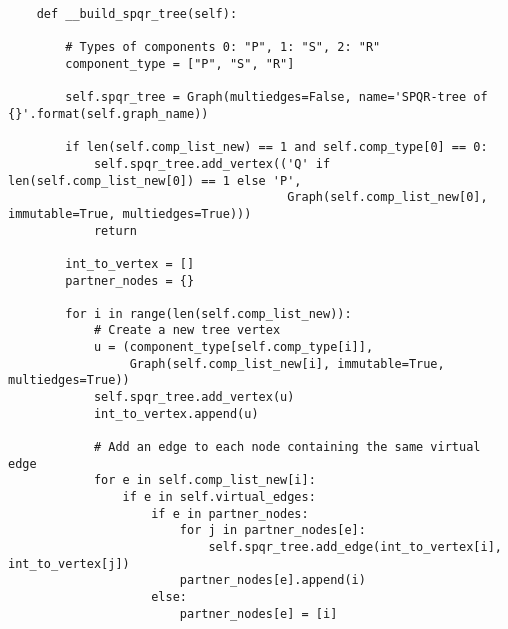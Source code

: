 \begin{center}
\begin{verbatim}
	def __build_spqr_tree(self):

		# Types of components 0: "P", 1: "S", 2: "R"
		component_type = ["P", "S", "R"]

		self.spqr_tree = Graph(multiedges=False, name='SPQR-tree of {}'.format(self.graph_name))

		if len(self.comp_list_new) == 1 and self.comp_type[0] == 0:
			self.spqr_tree.add_vertex(('Q' if len(self.comp_list_new[0]) == 1 else 'P',
									   Graph(self.comp_list_new[0], immutable=True, multiedges=True)))
			return

		int_to_vertex = []
		partner_nodes = {}

		for i in range(len(self.comp_list_new)):
			# Create a new tree vertex
			u = (component_type[self.comp_type[i]],
				 Graph(self.comp_list_new[i], immutable=True, multiedges=True))
			self.spqr_tree.add_vertex(u)
			int_to_vertex.append(u)

			# Add an edge to each node containing the same virtual edge
			for e in self.comp_list_new[i]:
				if e in self.virtual_edges:
					if e in partner_nodes:
						for j in partner_nodes[e]:
							self.spqr_tree.add_edge(int_to_vertex[i], int_to_vertex[j])
						partner_nodes[e].append(i)
					else:
						partner_nodes[e] = [i]

\end{verbatim}
\end{center}